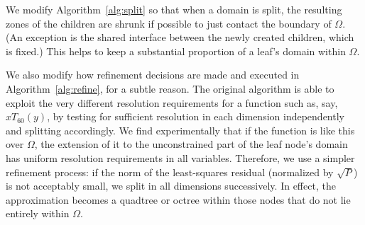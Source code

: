 We modify Algorithm~\ref{alg:split} so that when a domain is split, the resulting zones of the children are shrunk if possible to just contact the boundary of $\Omega$. (An exception is the shared interface between the newly created children, which is fixed.) This helps to keep a substantial proportion of a leaf's domain within $\Omega$.

We also modify how refinement decisions are made and executed in Algorithm~\ref{alg:refine}, for a subtle reason. The original algorithm is able to exploit the very different resolution requirements for a function such as, say, $xT_{60}(y)$, by testing for sufficient resolution in each dimension independently and splitting accordingly. We find experimentally that if the function is like this over $\Omega$, the extension of it to the unconstrained part of the leaf node's domain has uniform resolution requirements in all variables. Therefore, we use a simpler refinement process: if the norm of the least-squares residual (normalized by $\sqrt{P}$) is not acceptably small, we split in all dimensions successively. In effect, the approximation becomes a quadtree or octree within those nodes that do not lie entirely within $\Omega$. 



